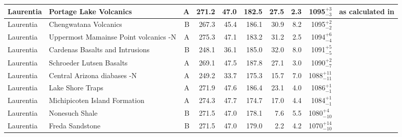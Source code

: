\begin{longtable}{p{1 in}p{1 in}rrrrrrrp{1.5 in}}
                     Laurentia &                           Portage Lake Volcanics &      A &     271.2 &      47.0 & 182.5 &  27.5 &       2.3 &     1095$^{+3}_{-3}$ &  \cite{Books1972a, Hnat2006a} as calculated in \cite{Swanson-Hysell2019a} \\ \hline
                     Laurentia &                            Chengwatana Volcanics &      B &     267.3 &      45.4 & 186.1 &  30.9 &       8.2 &     1095$^{+2}_{-2}$ &                                  \cite{Kean1997a} \\ \hline
                     Laurentia &            Uppermost Mamainse Point volcanics -N &      A &     275.3 &      47.1 & 183.2 &  31.2 &       2.5 &     1094$^{+6}_{-4}$ &                         \cite{Swanson-Hysell2014a} \\ \hline
                     Laurentia &                  Cardenas Basalts and Intrusions &      B &     248.1 &      36.1 & 185.0 &  32.0 &       8.0 &     1091$^{+5}_{-5}$ &                                   \cite{Weil2003a} \\ \hline
                     Laurentia &                         Schroeder Lutsen Basalts &      A &     269.1 &      47.5 & 187.8 &  27.1 &       3.0 &     1090$^{+2}_{-7}$ &                              \cite{Fairchild2017a} \\ \hline
                     Laurentia &                      Central Arizona diabases -N &      A &     249.2 &      33.7 & 175.3 &  15.7 &       7.0 &   1088$^{+11}_{-11}$ &                               \cite{Donadini2011b} \\ \hline
                     Laurentia &                                 Lake Shore Traps &      A &     271.9 &      47.6 & 186.4 &  23.1 &       4.0 &     1086$^{+1}_{-1}$ &                                \cite{Kulakov2013a} \\ \hline
                     Laurentia &                    Michipicoten Island Formation &      A &     274.3 &      47.7 & 174.7 &  17.0 &       4.4 &     1084$^{+1}_{-1}$ &                              \cite{Fairchild2017a} \\ \hline
                     Laurentia &                                   Nonesuch Shale &      B &     271.5 &      47.0 & 178.1 &   7.6 &       5.5 &    1080$^{+4}_{-10}$ &                                  \cite{Henry1977a} \\ \hline
                     Laurentia &                                  Freda Sandstone &      B &     271.5 &      47.0 & 179.0 &   2.2 &       4.2 &   1070$^{+14}_{-10}$ &                                  \cite{Henry1977a} \\ \hline

\end{longtable}
